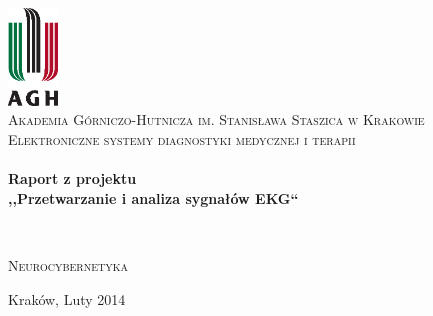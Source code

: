 \begin{titlepage}
\begin{center}

\includegraphics[width=0.10\textwidth]{./agh_logo.eps}~\\[1cm]

\textsc{\LARGE Akademia Górniczo-Hutnicza im. Stanisława Staszica w Krakowie}\\[0.8cm]

\textsc{\Large Elektroniczne systemy diagnostyki medycznej i terapii}\\[0.5cm]

\HRule \\[0.4cm]
{ \huge \bfseries Raport z projektu \\ ,,Przetwarzanie i analiza sygnałów EKG`` \\[0.4cm] }

\HRule \\[0.6cm]

\begin{minipage}{0.8\textwidth}
\begin{flushleft} \large
\textsc{Neurocybernetyka}
\end{flushleft}
\end{minipage}
\begin{minipage}{0.4\textwidth}
\end{minipage}

\vfill

{\large Kraków, Luty 2014}

\end{center}
\end{titlepage}